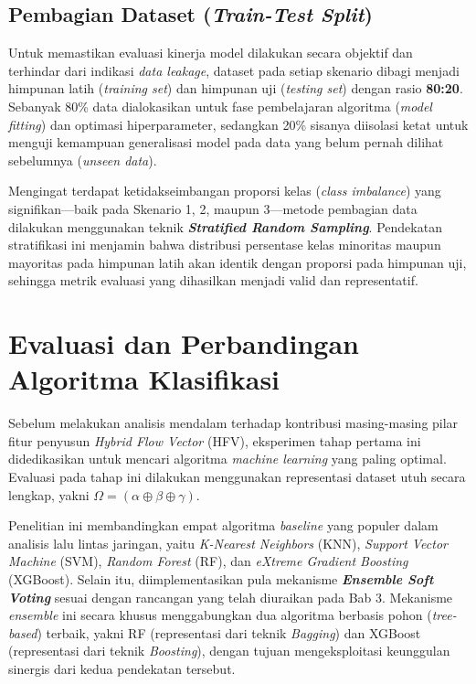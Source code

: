 \subsection{Pembagian Dataset (\textit{Train-Test Split})}

Untuk memastikan evaluasi kinerja model dilakukan secara objektif dan terhindar dari indikasi \textit{data leakage}, dataset pada setiap skenario dibagi menjadi himpunan latih (\textit{training set}) dan himpunan uji (\textit{testing set}) dengan rasio \textbf{80:20}. Sebanyak 80\% data dialokasikan untuk fase pembelajaran algoritma (\textit{model fitting}) dan optimasi hiperparameter, sedangkan 20\% sisanya diisolasi ketat untuk menguji kemampuan generalisasi model pada data yang belum pernah dilihat sebelumnya (\textit{unseen data}).

Mengingat terdapat ketidakseimbangan proporsi kelas (\textit{class imbalance}) yang signifikan—baik pada Skenario 1, 2, maupun 3—metode pembagian data dilakukan menggunakan teknik \textbf{\textit{Stratified Random Sampling}}. Pendekatan stratifikasi ini menjamin bahwa distribusi persentase kelas minoritas maupun mayoritas pada himpunan latih akan identik dengan proporsi pada himpunan uji, sehingga metrik evaluasi yang dihasilkan menjadi valid dan representatif.

\section{Evaluasi dan Perbandingan Algoritma Klasifikasi}
\label{sec:evaluasi_algoritma}

Sebelum melakukan analisis mendalam terhadap kontribusi masing-masing pilar fitur penyusun \textit{Hybrid Flow Vector} (HFV), eksperimen tahap pertama ini didedikasikan untuk mencari algoritma \textit{machine learning} yang paling optimal. Evaluasi pada tahap ini dilakukan menggunakan representasi dataset utuh secara lengkap, yakni $\Omega = (\alpha \oplus \beta \oplus \gamma)$.

Penelitian ini membandingkan empat algoritma \textit{baseline} yang populer dalam analisis lalu lintas jaringan, yaitu \textit{K-Nearest Neighbors} (KNN), \textit{Support Vector Machine} (SVM), \textit{Random Forest} (RF), dan \textit{eXtreme Gradient Boosting} (XGBoost). Selain itu, diimplementasikan pula mekanisme \textbf{\textit{Ensemble Soft Voting}} sesuai dengan rancangan yang telah diuraikan pada Bab 3. Mekanisme \textit{ensemble} ini secara khusus menggabungkan dua algoritma berbasis pohon (\textit{tree-based}) terbaik, yakni RF (representasi dari teknik \textit{Bagging}) dan XGBoost (representasi dari teknik \textit{Boosting}), dengan tujuan mengeksploitasi keunggulan sinergis dari kedua pendekatan tersebut.

